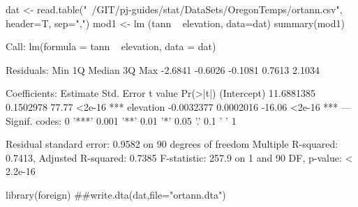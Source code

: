 \begin{Schunk}
\begin{Sinput}
 dat <- read.table("~/GIT/pj-guides/stat/DataSets/OregonTemps/ortann.csv", header=T, sep=",")
 mod1 <- lm (tann ~ elevation, data=dat)
 summary(mod1)
\end{Sinput}
\begin{Soutput}
Call:
lm(formula = tann ~ elevation, data = dat)

Residuals:
    Min      1Q  Median      3Q     Max 
-2.6841 -0.6026 -0.1081  0.7613  2.1034 

Coefficients:
              Estimate Std. Error t value Pr(>|t|)    
(Intercept) 11.6881385  0.1502978   77.77   <2e-16 ***
elevation   -0.0032377  0.0002016  -16.06   <2e-16 ***
---
Signif. codes:  0 '***' 0.001 '**' 0.01 '*' 0.05 '.' 0.1 ' ' 1

Residual standard error: 0.9582 on 90 degrees of freedom
Multiple R-squared:  0.7413,	Adjusted R-squared:  0.7385 
F-statistic: 257.9 on 1 and 90 DF,  p-value: < 2.2e-16
\end{Soutput}
\begin{Sinput}
 library(foreign)
 ##write.dta(dat,file="ortann.dta")
\end{Sinput}
\end{Schunk}

